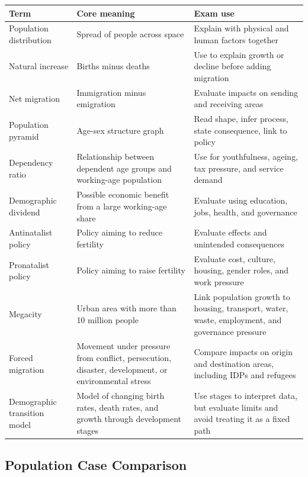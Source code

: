 \documentclass[11pt,a4paper]{article}
\begin{document}
\begin{tabularx}{\textwidth}{L{0.23\textwidth}Y Y}
\toprule
\textbf{Term} & \textbf{Core meaning} & \textbf{Exam use} \\
\midrule
Population distribution & Spread of people across space & Explain with physical
and human factors together \\
Natural increase & Births minus deaths & Use to explain growth or decline
before adding migration \\
Net migration & Immigration minus emigration & Evaluate impacts on sending and
receiving areas \\
Population pyramid & Age-sex structure graph & Read shape, infer process, state
consequence, link to policy \\
Dependency ratio & Relationship between dependent age groups and working-age
population & Use for youthfulness, ageing, tax pressure, and service demand \\
Demographic dividend & Possible economic benefit from a large working-age
share & Evaluate using education, jobs, health, and governance \\
Antinatalist policy & Policy aiming to reduce fertility & Evaluate effects and
unintended consequences \\
Pronatalist policy & Policy aiming to raise fertility & Evaluate cost, culture,
housing, gender roles, and work pressure \\
Megacity & Urban area with more than 10 million people & Link population growth
to housing, transport, water, waste, employment, and governance pressure \\
Forced migration & Movement under pressure from conflict, persecution,
disaster, development, or environmental stress & Compare impacts on origin and
destination areas, including IDPs and refugees \\
Demographic transition model & Model of changing birth rates, death rates, and
growth through development stages & Use stages to interpret data, but evaluate
limits and avoid treating it as a fixed path \\
\bottomrule
\end{tabularx}

\subsection{Population Case Comparison}
\end{document}
